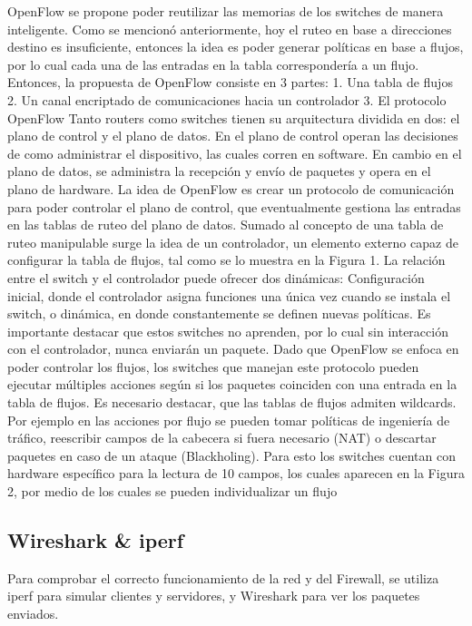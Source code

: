 \documentclass{article}
\begin{document}
OpenFlow se propone poder reutilizar las memorias de los
switches de manera inteligente. Como se mencionó anteriormente, hoy el ruteo en base a direcciones destino es insuficiente,
entonces la idea es poder generar políticas en base a flujos, por lo cual cada una de las entradas en la tabla correspondería
a un flujo. Entonces, la propuesta de OpenFlow consiste en 3 partes:
1. Una tabla de flujos
2. Un canal encriptado de comunicaciones hacia un controlador
3. El protocolo OpenFlow
Tanto routers como switches tienen su arquitectura dividida en dos: el plano de control y el plano de datos. En el
plano de control operan las decisiones de como administrar el dispositivo, las cuales corren en software. En cambio en el
plano de datos, se administra la recepción y envío de paquetes y opera en el plano de hardware. La idea de OpenFlow es
crear un protocolo de comunicación para poder controlar el plano de control, que eventualmente gestiona las entradas en
las tablas de ruteo del plano de datos.
Sumado al concepto de una tabla de ruteo manipulable surge la idea de un controlador, un elemento externo capaz de
configurar la tabla de flujos, tal como se lo muestra en la Figura 1. La relación entre el switch y el controlador puede ofrecer
dos dinámicas: Configuración inicial, donde el controlador asigna funciones una única vez cuando se instala el switch, o
dinámica, en donde constantemente se definen nuevas políticas. Es importante destacar que estos switches no aprenden,
por lo cual sin interacción con el controlador, nunca enviarán un paquete.
Dado que OpenFlow se enfoca en poder controlar los flujos, los switches que manejan este protocolo pueden ejecutar
múltiples acciones según si los paquetes coinciden con una entrada en la tabla de flujos. Es necesario destacar, que las
tablas de flujos admiten wildcards. Por ejemplo en las acciones por flujo se pueden tomar políticas de ingeniería de tráfico,
reescribir campos de la cabecera si fuera necesario (NAT) o descartar paquetes en caso de un ataque (Blackholing). Para
esto los switches cuentan con hardware específico para la lectura de 10 campos, los cuales aparecen en la Figura 2, por
medio de los cuales se pueden individualizar un flujo

\subsection{Wireshark \& iperf}\label{stop-and-wait}

Para comprobar el correcto funcionamiento de la red y del Firewall, se utiliza iperf para
simular clientes y servidores, y Wireshark para ver los paquetes enviados.
\end{document}
